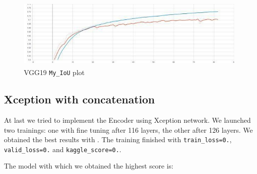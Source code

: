 \documentclass{article}
\begin{document}
			\begin{figure}[H]
				\centering
				\includegraphics[height=3.4cm, keepaspectratio]{VGG19_Dec17_my_IoU.jpg}
				\caption{VGG19 \texttt{My\_IoU} plot}
			\end{figure}
			
		\subsection{Xception with concatenation}
			
			At last we tried to implement the Encoder using Xception network. We launched two trainings: one with fine tuning after 116 layers, the other after 126 layers. We obtained the best results with . The training finished with \texttt{train\_loss=0.}, \texttt{valid\_loss=0.} and \texttt{kaggle\_score=0.}.
			
	
			
			The model with which we obtained the highest score is: 
			
\end{document}
